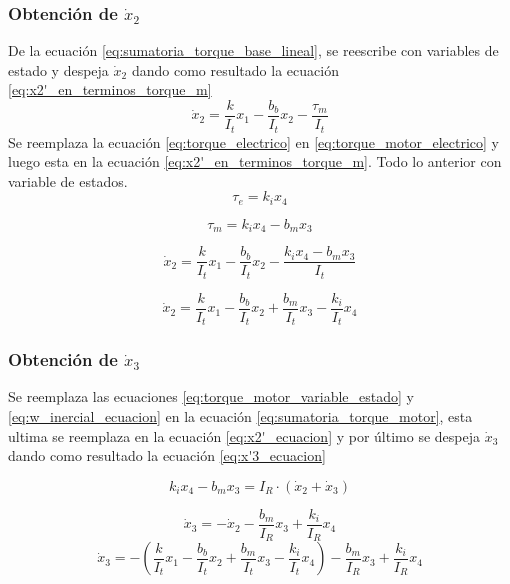 \documentclass[conference]{IEEEtran}
\begin{document}
\subsubsection{Obtención de $\dot{x}_2$}
De la ecuación \eqref{eq:sumatoria_torque_base_lineal}, se reescribe con variables de estado y despeja $\dot{x}_2$ dando como resultado la ecuación \eqref{eq:x2'_en_terminos_torque_m}
\begin{equation}
    \dot{x}_2=\frac{k}{I_t}x_1-\frac{b_b}{I_t}x_2-\frac{\tau_m}{I_t}
    \label{eq:x2'_en_terminos_torque_m}
\end{equation}
Se reemplaza la ecuación  \eqref{eq:torque_electrico} en  \eqref{eq:torque_motor_electrico} y luego esta en la ecuación \eqref{eq:x2'_en_terminos_torque_m}. Todo lo anterior con variable de estados.
 \begin{equation*}
      \tau_e= k_i x_4
 \end{equation*}

 \begin{equation}
      \tau_m=  k_ix_4-b_m x_3 
      \label{eq:torque_motor_variable_estado}
 \end{equation}

\begin{equation*}
    \dot{x}_2=\frac{k}{I_t}x_1-\frac{b_b}{I_t}x_2-\frac{k_ix_4-b_m x_3}{I_t}
\end{equation*}

\begin{equation}
    \dot{x}_2=\frac{k}{I_t}x_1-\frac{b_b}{I_t}x_2+\frac{b_m }{I_t} x_3-\frac{k_i}{I_t}x_4
    \label{eq:x2'_ecuacion}
\end{equation}
\subsubsection{Obtención de $\dot{x}_3$}
Se reemplaza las ecuaciones \eqref{eq:torque_motor_variable_estado} y \eqref{eq:w_inercial_ecuacion} en la ecuación \eqref{eq:sumatoria_torque_motor}, esta ultima se reemplaza en la ecuación \eqref{eq:x2'_ecuacion} y por último se despeja $\dot{x}_3$ dando como resultado la ecuación \eqref{eq:x'3_ecuacion}

\begin{equation*}
    k_ix_4-b_m x_3 = I_{R} \cdot (\dot{x}_2+\dot{x}_3)
\end{equation*}

\begin{equation*}
    \dot{x}_3=-\dot{x}_2-\frac{b_m}{I_R} x_3 +\frac{k_i}{I_R}x_4
\end{equation*}
\begin{equation*}
    \dot{x}_3 = -\left(\frac{k}{I_t}x_1-\frac{b_b}{I_t}x_2+\frac{b_m }{I_t} x_3-\frac{k_i}{I_t}x_4\right)  - \frac{b_m}{I_R} x_3 +\frac{k_i}{I_R}x_4
\end{equation*}
\end{document}
